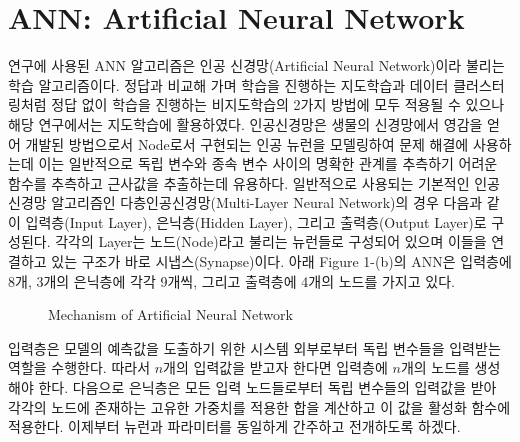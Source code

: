 \documentclass{article}
\begin{document}
\section{ANN: Artificial Neural Network}
연구에 사용된 ANN 알고리즘은 인공 신경망(Artificial Neural Network)이라 불리는 학습 알고리즘이다. 정답과 비교해 가며 학습을 진행하는 지도학습과 데이터 클러스터링처럼 정답 없이 학습을 진행하는 비지도학습의 2가지 방법에 모두 적용될 수 있으나 해당 연구에서는 지도학습에 활용하였다. 인공신경망은 생물의 신경망에서 영감을 얻어 개발된 방법으로서 Node로서 구현되는 인공 뉴런을 모델링하여 문제 해결에 사용하는데 이는 일반적으로 독립 변수와 종속 변수 사이의 명확한 관계를 추측하기 어려운 함수를 추측하고 근사값을 추출하는데 유용하다. \newline
일반적으로 사용되는 기본적인 인공신경망 알고리즘인 다층인공신경망(Multi-Layer Neural Network)의 경우 다음과 같이 입력층(Input Layer), 은닉층(Hidden Layer), 그리고 출력층(Output Layer)로 구성된다. 각각의 Layer는 노드(Node)라고 불리는 뉴런들로 구성되어 있으며 이들을 연결하고 있는 구조가 바로 시냅스(Synapse)이다. 아래 Figure 1-(b)의 ANN은 입력층에 8개, 3개의 은닉층에 각각 9개씩, 그리고 출력층에 4개의 노드를 가지고 있다.

\begin{figure}[h]
\centering
{}
\caption{Mechanism of Artificial Neural Network}
\label{fig_1}
\end{figure}

입력층은 모델의 예측값을 도출하기 위한 시스템 외부로부터 독립 변수들을 입력받는 역할을 수행한다. 따라서 $n$개의 입력값을 받고자 한다면 입력층에 $n$개의 노드를 생성해야 한다. 다음으로 은닉층은 모든 입력 노드들로부터 독립 변수들의 입력값을 받아 각각의 노드에 존재하는 고유한 가중치를 적용한 합을 계산하고 이 값을 활성화 함수에 적용한다. 이제부터 뉴런과 파라미터를 동일하게 간주하고 전개하도록 하겠다.
\end{document}
